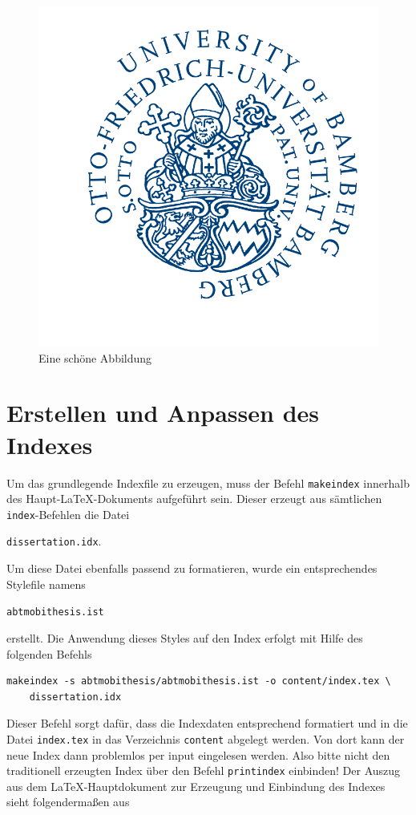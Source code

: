 \begin{figure}[ht]
  \centering
  \includegraphics[width=.4\textwidth]{abtmobithesis/unilogo.png}
  \caption{Eine sch\"{o}ne Abbildung}\label{abbildung}
\end{figure}


\section{Erstellen und Anpassen des Indexes}
Um das grundlegende Indexfile zu erzeugen, muss der Befehl
\texttt{makeindex} innerhalb des Haupt-\LaTeX-Dokuments aufgef\"{u}hrt sein.
Dieser erzeugt aus s\"{a}mtlichen \texttt{index}-Befehlen die Datei

\texttt{dissertation.idx}.

Um diese Datei ebenfalls passend zu
formatieren, wurde ein entsprechendes Stylefile namens

\texttt{abtmobithesis.ist}

erstellt. Die Anwendung dieses Styles auf den
Index erfolgt mit Hilfe des folgenden Befehls

\begin{verbatim}
makeindex -s abtmobithesis/abtmobithesis.ist -o content/index.tex \
    dissertation.idx
\end{verbatim}

Dieser Befehl sorgt daf\"{u}r, dass die Indexdaten entsprechend
formatiert und in die Datei \texttt{index.tex} in das Verzeichnis
\texttt{content} abgelegt werden. Von dort kann der neue Index
dann problemlos per input eingelesen werden. Also bitte nicht den
traditionell erzeugten Index \"{u}ber den Befehl
\texttt{printindex} einbinden! Der Auszug aus dem
\LaTeX-Hauptdokument zur Erzeugung und Einbindung des Indexes sieht
folgenderma{\ss}en aus

